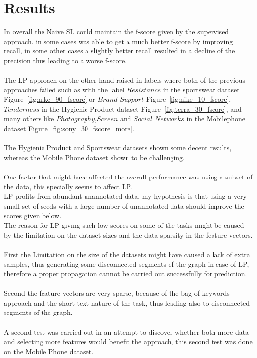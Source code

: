 \documentclass[4pt,a4paper,twocolumn]{article}
\begin{document}
\section{Results}
In overall the Naive SL could maintain the f-score given by the supervised approach, in some cases was able to get a much better f-score by improving recall, in some other cases a slightly better recall resulted in a decline of the precision thus leading to a worse f-score.\\
\\
The LP approach on the other hand raised in labels where both of the previous approaches failed such as with the label $Resistance$  in the sportswear dataset Figure~\ref{fig:nike_90_fscore} or $Brand$ $Support$ Figure~\ref{fig:nike_10_fscore},  $Tenderness$  in the Hygienic Product dataset Figure~\ref{fig:terra_30_fscore}, and many others like $Photography$,$Screen$ and $Social$ $Networks$ in the Mobilephone dataset Figure~\ref{fig:sony_30_fscore_more}.\\
\\
The Hygienic Product and Sportswear datasets shown some decent results, whereas the Mobile Phone dataset shown to be challenging.\\
\\
One factor that might have affected the overall performance was using a subset of the data, this specially seems to affect LP.\\
LP profits from abundant unannotated data, my hypothesis is that using a very small set of seeds with a large number of unannotated data should improve the scores given below.\\
The reason for LP giving such low scores  on some of the tasks might be caused by the limitation on the dataset sizes and the data sparsity in the feature vectors.\\
\\
First the Limitation on the size of the datasets might have caused a lack of extra samples, thus  generating some disconnected segments of the graph in case of LP, therefore a proper propagation cannot be carried out successfully for prediction.\\
\\
Second the feature vectors are very sparse, because of the bag of keywords approach and the short text nature of the task, thus leading also to disconnected segments of the graph.\\
\\
A second test was carried out in an attempt to discover whether both more data and selecting more features would benefit the approach, this second test was done on the Mobile Phone dataset.\\
\end{document}
